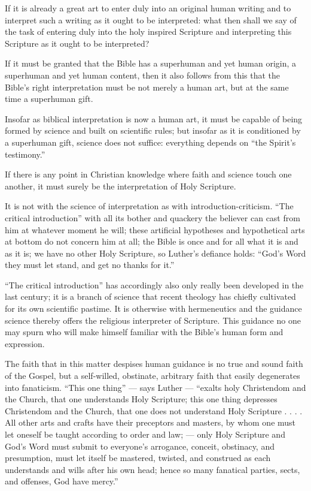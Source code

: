 \documentclass[12pt,a4paper]{book}
\begin{document}
If it is already a great art to enter duly into an original human writing and to
interpret such a writing as it ought to be interpreted: what then shall we say of
the task of entering duly into the holy inspired Scripture and interpreting this
Scripture as it ought to be interpreted?

If it must be granted that the Bible has a superhuman and yet human origin, a
superhuman and yet human content, then it also follows from this that the Bible's
right interpretation must be not merely a human art, but at the same time a
superhuman gift.

Insofar as biblical interpretation is now a human art, it must be capable of being
formed by science and built on scientific rules; but insofar as it is conditioned by
a superhuman gift, science does not suffice: everything depends on ``the Spirit's
testimony.''

If there is any point in Christian knowledge where faith and science touch one
another, it must surely be the interpretation of Holy Scripture.

It is not with the science of interpretation as with introduction-criticism. ``The
critical introduction'' with all its bother and quackery the believer can cast from
him at whatever moment he will; these artificial hypotheses and hypothetical arts
at bottom do not concern him at all; the Bible is once and for all what it is and
as it is; we have no other Holy Scripture, so Luther's defiance holds: ``God's Word
they must let stand, and get no thanks for it.''

``The critical introduction'' has accordingly also only really been developed in the
last century; it is a branch of science that recent theology has chiefly cultivated
for its own scientific pastime. It is otherwise with hermeneutics and the guidance
science thereby offers the religious interpreter of Scripture. This guidance no one
may spurn who will make himself familiar with the Bible's human form and expression.

The faith that in this matter despises human guidance is no true and sound faith of
the Gospel, but a self-willed, obstinate, arbitrary faith that easily degenerates
into fanaticism. ``This one thing'' --- says Luther --- ``exalts holy Christendom
and the Church, that one understands Holy Scripture; this one thing depresses
Christendom and the Church, that one does not understand Holy Scripture . . . . All
other arts and crafts have their preceptors and masters, by whom one must let
oneself be taught according to order and law; --- only Holy Scripture and God's Word
must submit to everyone's arrogance, conceit, obstinacy, and presumption, must let
itself be mastered, twisted, and construed as each understands and wills after his
own head; hence so many fanatical parties, sects, and offenses, God have mercy.''
\end{document}
